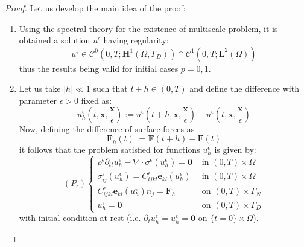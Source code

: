 \begin{proof}
Let us develop the main idea of the proof:\\
\begin{enumerate}
    \item Using the spectral theory for the existence of multiscale problem, it is obtained a solution $u^{\epsilon}$ having regularity:
    \begin{equation*}
        u^{\epsilon} \in \mathcal{C}^0(0,T;\mathbf{H}^1(\Omega, \Gamma_D)) \cap \mathcal{C}^1(0,T;\mathbf{L}^2(\Omega))
    \end{equation*}
    thus the results being valid for initial cases $p = 0, 1$.
    \item Let us take $\vert h \vert \ll 1$ such that $t+h \in (0,T)$ and define the difference with parameter $\epsilon > 0$ fixed as:
    \begin{equation*}
        u_h^{\epsilon}(t, \mathbf{x}, \frac{\mathbf{x}}{\epsilon}) := u^{\epsilon} (t+h, \mathbf{x}, \frac{\mathbf{x}}{\epsilon}) - u^{\epsilon}(t, \mathbf{x}, \frac{\mathbf{x}}{\epsilon})
    \end{equation*}
    Now, defining the difference of surface forces as
    \begin{equation*}
        \mathbf{F}_h(t):= \mathbf{F}(t+h) - \mathbf{F}(t)
    \end{equation*}
    it follows that the problem satisfied for functions $u_h^{\epsilon}$ is given by:
    \begin{equation*}
        (P_{\epsilon}) \left \{
        \begin{array}{cc}
            \rho^{\epsilon} \partial_{tt} u_h^{\epsilon} - \nabla \cdot \sigma^{\epsilon}( u_h^{\epsilon} ) = \mathbf{0}  &  \text{ in } (0,T)\times \Omega \\
            \sigma^{\epsilon}_{ij} (u^{\epsilon}_h) = C^{\epsilon}_{ijkl} \mathbf{e}_{kl}(u^{\epsilon}_h) & \text{ in } (0,T) \times \Omega \\
            C^{\epsilon}_{ijkl}\mathbf{e}_{kl}( u_h^{\epsilon})n_j = \mathbf{F}_h & \text{ on } (0,T)\times \Gamma_N \\
            u^{\epsilon}_h = \mathbf{0} & \text{ on }(0,T)\times \Gamma_D
        \end{array}
        \right .
    \end{equation*}
    with initial condition at rest (i.e. $\partial_t u_h^{\epsilon} = u_h^{\epsilon} = \mathbf{0}$ on $\{t=0\} \times \Omega$).
    

\end{enumerate}
\end{proof}
